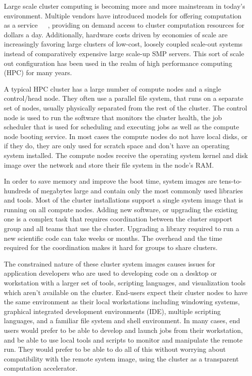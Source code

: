 Large scale cluster computing is becoming more and more mainstream
in today's environment.  Multiple vendors have introduced models for
offering computation as a service~\cite{ec2}~\cite{azure}~\cite{appengine},
providing on demand access to cluster computation resources for
dollars a day.  Additionally, hardware costs driven by economies of scale 
are increasingly favoring large clusters of low-cost, loosely coupled 
scale-out systems instead of comparatively expensive large scale-up 
SMP servers.  This sort of scale out configuration has been used in 
the realm of high performance computing (HPC) for many years.

A typical HPC cluster has a large number of compute nodes and a single
control/head node. They often use a parallel file system, that runs on 
a separate set of nodes, usually physically separated from the rest of the 
cluster. 
The control node is used to run the software that monitors the cluster 
health, the job scheduler that is used for scheduling and executing jobs 
as well as the compute node booting service. 
In most cases the compute nodes do not have
local disks, or if they do, they are only used for scratch space and don't
have an operating system installed. 
The compute nodes receive the operating system kernel and disk image over 
the network and store their file system in the node's RAM. 

In order to save memory and improve the boot time, 
system images are tens-to-hundreds of megabytes large and contain only the
most commonly used libraries and tools. Most of the cluster installations
support a single system image that is running on all compute nodes. Adding
new software, or upgrading the existing one is a complex task that requires
coordination between the cluster support group and all teams that use the
cluster. Upgrading a library required to run a new scientific code can take
weeks or months. The overhead and the time required for the coordination
makes it hard for groups to share clusters.

The constrained nature of these cluster system images causes issues for
application developers who are used to developing code on a desktop or
workstation with a larger set of tools, scripting languages, and 
visualization tools which aren't available on the cluster.
End-users expect their cluster nodes to have the same environment 
as their local workstations including windowing systems, graphical 
integrated development environments (IDE), multiple scripting languages,
and a familiar file system and shell environment.  In many cases, end users
would prefer to be able to develop and launch jobs from their workstation,
and be able to use local tools and scripts to monitor and manipulate the
remote run.  They would prefer to be able to do all of this without
worrying about compatibility with the remote system image, using the 
cluster as a transparent computation accelerator.

